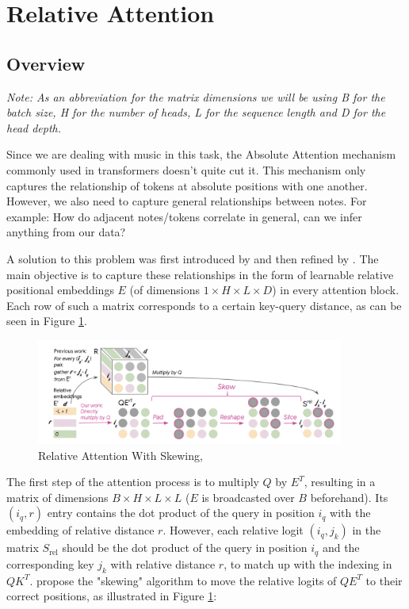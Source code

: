 \documentclass[a4paper,12pt]{extarticle}
\begin{document}
\section{Relative Attention}
\subsection{Overview}

\textit{Note: As an abbreviation for the matrix dimensions we will be using B for the batch size, H for the number of heads, L for the sequence length and D for the head depth.} \newline

Since we are dealing with music in this task, the Absolute Attention mechanism commonly used in transformers \parencite{DBLP:journals/corr/VaswaniSPUJGKP17} doesn't quite cut it. This mechanism only captures the relationship of tokens at absolute positions with one another. However, we also need to capture general relationships between notes. For example: How do adjacent notes/tokens correlate in general, can we infer anything from our data? \newline

A solution to this problem was first introduced by \textcite{shaw2018selfattentionrelativepositionrepresentations} and then refined by \textcite{DBLP:journals/corr/abs-1809-04281}. The main objective is to capture these relationships in the form of learnable relative positional embeddings $E$ (of dimensions $1 \times H \times L \times D$) in every attention block. Each row of such a matrix corresponds to a certain key-query distance, as can be seen in Figure \ref{fig:relatt}. 
\newline

\begin{figure}[H] %
    \centering
    \includegraphics[width=0.9\textwidth]{relative_attn_skewing.png} %
    \caption{Relative Attention With Skewing, \textcite{DBLP:journals/corr/abs-1809-04281}}
    \label{fig:relatt}
\end{figure}
\vspace{0.1cm}
The first step of the attention process is to multiply $Q$ by $E^T$, resulting in a matrix of dimensions $B \times H \times L \times L$ ($E$ is broadcasted over $B$ beforehand). Its $(i_q, r)$ entry contains the dot product of the query in position $i_q$ with the embedding of relative distance $r$. However, each relative logit $(i_q, j_k)$ in the matrix $S_\text{rel}$  should be the dot product of the query in position $i_q$ and the corresponding key $j_k$ with relative distance $r$, to match up with the indexing in $QK^T$.
\textcite{DBLP:journals/corr/abs-1809-04281} propose the "skewing" algorithm to move the relative logits of $QE^T$ to their correct positions, as illustrated in Figure \ref{fig:relatt}:
\end{document}
